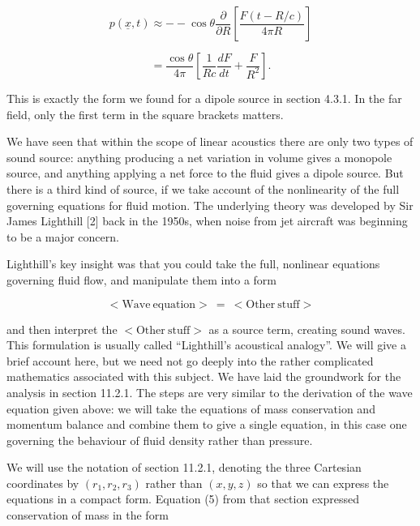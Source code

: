   \begin{equation*}p(\underline{x},t) \approx -- \cos \theta 
  \dfrac{\partial}{\partial R} \left[ \dfrac{F(t-R/c)}{4 \pi R} 
  \right]\end{equation*} 

  \begin{equation*} = \dfrac{\cos \theta}{4 \pi}\left[ \dfrac{1}{Rc} 
  \dfrac{dF}{dt} + \dfrac{F}{R^2} \right] . \tag{21}\end{equation*} 

  This is exactly the form we found for a dipole source in section 4.3.1. In 
  the far field, only the first term in the square brackets matters. 

  We have seen that within the scope of linear acoustics there are only two 
  types of sound source: anything producing a net variation in volume gives a 
  monopole source, and anything applying a net force to the fluid gives a 
  dipole source. But there is a third kind of source, if we take account of the 
  nonlinearity of the full governing equations for fluid motion. The underlying 
  theory was developed by Sir James Lighthill [2] back in the 1950s, when noise 
  from jet aircraft was beginning to be a major concern. 

  Lighthill's key insight was that you could take the full, nonlinear equations 
  governing fluid flow, and manipulate them into a form 

  \begin{equation*}<\mathrm{Wave~equation}>\mathrm{~}= 
  \mathrm{~}<\mathrm{Other~stuff}>\end{equation*} 

  \noindent{}and then interpret the $<\mathrm{Other~stuff}>$ as a source term, 
  creating sound waves. This formulation is usually called ``Lighthill's 
  acoustical analogy''. We will give a brief account here, but we need not go 
  deeply into the rather complicated mathematics associated with this subject. 
  We have laid the groundwork for the analysis in section 11.2.1. The steps are 
  very similar to the derivation of the wave equation given above: we will take 
  the equations of mass conservation and momentum balance and combine them to 
  give a single equation, in this case one governing the behaviour of fluid 
  density rather than pressure. 

  We will use the notation of section 11.2.1, denoting the three Cartesian 
  coordinates by $(r_1,r_2,r_3)$ rather than $(x,y,z)$ so that we can express 
  the equations in a compact form. Equation (5) from that section expressed 
  conservation of mass in the form 


